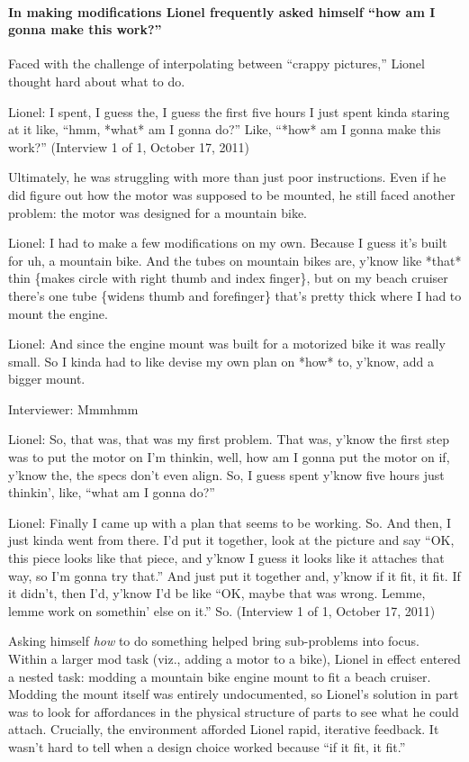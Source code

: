 \paragraph{In making modifications Lionel frequently asked himself ``how
am I gonna make this
work?''}\label{in-making-modifications-lionel-frequently-asked-himself-how-am-i-gonna-make-this-work}

Faced with the challenge of interpolating between ``crappy pictures,''
Lionel thought hard about what to do.

Lionel: I spent, I guess the, I guess the first five hours I just spent
kinda staring at it like, ``hmm, *what* am I gonna do?'' Like, ``*how*
am I gonna make this work?'' (Interview 1 of 1, October 17, 2011)

Ultimately, he was struggling with more than just poor instructions.
Even if he did figure out how the motor was supposed to be mounted, he
still faced another problem: the motor was designed for a mountain bike.

Lionel: I had to make a few modifications on my own. Because I guess
it's built for uh, a mountain bike. And the tubes on mountain bikes are,
y'know like *that* thin \{makes circle with right thumb and index
finger\}, but on my beach cruiser there's one tube \{widens thumb and
forefinger\} that's pretty thick where I had to mount the engine.

Lionel: And since the engine mount was built for a motorized bike it was
really small. So I kinda had to like devise my own plan on *how* to,
y'know, add a bigger mount.

Interviewer: Mmmhmm

Lionel: So, that was, that was my first problem. That was, y'know the
first step was to put the motor on I'm thinkin, well, how am I gonna put
the motor on if, y'know the, the specs don't even align. So, I guess
spent y'know five hours just thinkin', like, ``what am I gonna do?''

Lionel: Finally I came up with a plan that seems to be working. So. And
then, I just kinda went from there. I'd put it together, look at the
picture and say ``OK, this piece looks like that piece, and y'know I
guess it looks like it attaches that way, so I'm gonna try that.'' And
just put it together and, y'know if it fit, it fit. If it didn't, then
I'd, y'know I'd be like ``OK, maybe that was wrong. Lemme, lemme work on
somethin' else on it.'' So. (Interview 1 of 1, October 17, 2011)

Asking himself \emph{how} to do something helped bring sub-problems into
focus. Within a larger mod task (viz., adding a motor to a bike), Lionel
in effect entered a nested task: modding a mountain bike engine mount to
fit a beach cruiser. Modding the mount itself was entirely undocumented,
so Lionel's solution in part was to look for affordances in the physical
structure of parts to see what he could attach. Crucially, the
environment afforded Lionel rapid, iterative feedback. It wasn't hard to
tell when a design choice worked because ``if it fit, it fit.''

